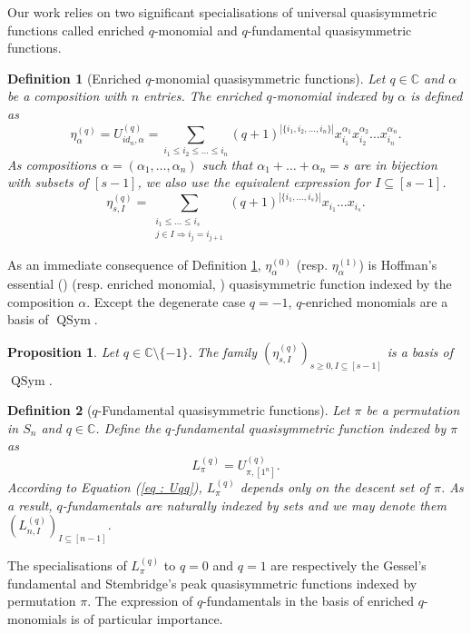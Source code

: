 \documentclass[submission]{FPSAC2023}
\newtheorem{defn}{Definition}
\newtheorem{proposition}{Proposition}
\newcommand{\al}{\alpha}
\newcommand{\CC}{\mathbb{C}} %
\newcommand{\QSym}{\operatorname{QSym}}
\begin{document}
%
Our work relies on two significant specialisations of universal quasisymmetric functions called enriched $q$-monomial and $q$-fundamental quasisymmetric functions.  
\begin{defn}[Enriched $q$-monomial quasisymmetric functions]
\label{def : EQ}
Let $q \in \CC$ and $\al$ be a composition with $n$ entries. The \emph{enriched $q$-monomial} indexed by $\al$ is defined as
\begin{equation*}
\label{eq : EU}
\eta^{(q)}_\al = U^{(q)}_{id_n,\alpha}= \sum_{i_1\leq i_2 \leq \dots \leq i_n}(q+1)^{|\{i_{1},i_{2},\dots, i_{n}\}|}x_{i_{1}}^{\alpha_{1}}x_{i_{2}}^{\alpha_{2}}\dots x_{i_{n}}^{\alpha_{n}}.
\end{equation*}
As compositions $\al = (\al_1,\dots,\al_n)$ such that $\al_1 + \dots + \al_n = s$ are in bijection with subsets of $[s-1]$, we also use the equivalent expression for $I \subseteq [s-1]$.
\begin{equation*}
\eta^{(q)}_{s, I} =\sum_{\substack{i_1\leq\dots\leq i_s\\ j \in I \Rightarrow i_j=i_{j+1}}}(q+1)^{|\{i_1,\dots,i_s\}|}x_{i_1}\dots x_{i_s}.
\end{equation*}
\end{defn}
As an immediate consequence of Definition \ref{def : EQ}, $\eta^{(0)}_\al$ (resp. $\eta^{(1)}_\al$)  is Hoffman's essential (\cite{Hof15})  (resp. enriched monomial, \cite{GriVas21}) quasisymmetric function indexed by the composition $\alpha$. Except the degenerate case $q=-1$, $q$-enriched monomials are a basis of $\QSym$. 
\begin{proposition}
Let $q \in \CC \setminus \{-1\}$. The family $\left(\eta^{(q)}_{s,I} \right )_{s\geq0, I\subseteq[s-1]}$ is a basis of $\QSym$.
\end{proposition}
\begin{defn}[$q$-Fundamental quasisymmetric functions]
Let $\pi$ be a permutation in $S_n$ and $q \in \CC$. Define the \emph{$q$-fundamental quasisymmetric function} indexed by $\pi$ as
\begin{equation*}
L_{\pi}^{(q)} = U^{(q)}_{\pi, [1^{n}]}.
\end{equation*}
According to Equation (\ref{eq : Uqq}), $L_{\pi}^{(q)}$ depends only on the descent set of $\pi$. As a result, $q$-fundamentals are naturally indexed by sets and we may denote them  $(L_{n, I}^{(q)})_{I \subseteq [n-1]}$. 
\end{defn}
The specialisations of $L_{\pi}^{(q)}$ to $q=0$ and $q=1$ are respectively the Gessel's fundamental \cite{Ges84} and Stembridge's peak \cite{Ste97} quasisymmetric functions indexed by permutation $\pi$. The expression of $q$-fundamentals in the basis of enriched $q$-monomials is of particular importance. 
\end{document}
